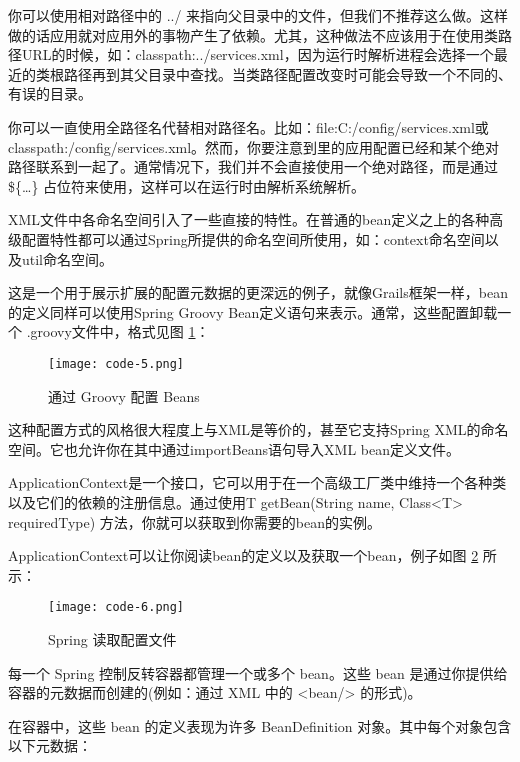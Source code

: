 你可以使用相对路径中的 ../ 来指向父目录中的文件，但我们不推荐这么做。这样做的话应用就对应用外的事物产生了依赖。尤其，这种做法不应该用于在使用类路径URL的时候，如：classpath:../services.xml，因为运行时解析进程会选择一个最近的类根路径再到其父目录中查找。当类路径配置改变时可能会导致一个不同的、有误的目录。

你可以一直使用全路径名代替相对路径名。比如：file:C:/config/services.xml或classpath:/config/services.xml。然而，你要注意到里的应用配置已经和某个绝对路径联系到一起了。通常情况下，我们并不会直接使用一个绝对路径，而是通过 \$\{…\} 占位符来使用，这样可以在运行时由解析系统解析。

XML文件中各命名空间引入了一些直接的特性。在普通的bean定义之上的各种高级配置特性都可以通过Spring所提供的命名空间所使用，如：context命名空间以及util命名空间。

这是一个用于展示扩展的配置元数据的更深远的例子，就像Grails框架一样，bean的定义同样可以使用Spring Groovy Bean定义语句来表示。通常，这些配置卸载一个 .groovy文件中，格式见图 \ref{fig:spring-code-5}：

\begin{figure}[!ht]
  \centering
  \texttt{[image: code-5.png]}
  \caption{通过 Groovy 配置 Beans}
  \label{fig:spring-code-5}
\end{figure}

这种配置方式的风格很大程度上与XML是等价的，甚至它支持Spring XML的命名空间。它也允许你在其中通过importBeans语句导入XML bean定义文件。

ApplicationContext是一个接口，它可以用于在一个高级工厂类中维持一个各种类以及它们的依赖的注册信息。通过使用T getBean(String name, Class<T> requiredType) 方法，你就可以获取到你需要的bean的实例。

ApplicationContext可以让你阅读bean的定义以及获取一个bean，例子如图 \ref{fig:spring-code-6} 所示：

\begin{figure}[!ht]
  \centering
  \texttt{[image: code-6.png]}
  \caption{Spring 读取配置文件}
  \label{fig:spring-code-6}
\end{figure}


每一个 Spring 控制反转容器都管理一个或多个 bean。这些 bean 是通过你提供给容器的元数据而创建的(例如：通过 XML 中的 <bean/> 的形式)。

在容器中，这些 bean 的定义表现为许多 BeanDefinition 对象。其中每个对象包含以下元数据：


